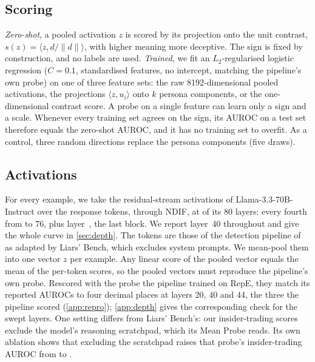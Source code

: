 \subsection{Scoring}

\emph{Zero-shot}, a pooled activation $z$ is scored by its projection onto the unit contrast,
$s(z)=\langle z, d/\lVert d\rVert\rangle$, with higher meaning more deceptive. The sign is fixed by
construction, and no labels are used. \emph{Trained}, we fit an $L_2$-regularised logistic
regression ($C=0.1$, standardised features, no intercept, matching the pipeline's own probe) on
one of three feature sets: the raw 8192-dimensional pooled activations, the projections
$\langle z,u_i\rangle$ onto $k$ persona components, or the one-dimensional contrast score. A probe
on a single feature can learn only a sign and a scale. Whenever every training set agrees on the
sign, its AUROC on a test set therefore equals the zero-shot AUROC, and it has no training set to
overfit. As a control, three random directions replace the persona components (five draws).

\subsection{Activations}

For every example, we take the residual-stream activations of Llama-3.3-70B-Instruct over the
response tokens, through NDIF, at  of its 80 layers: every fourth from 
to 76, plus layer~, the last block. We report layer~40 throughout and give the whole
curve in \cref{sec:depth}. The tokens are those of the
detection pipeline of \citet{goldowskydill2025detecting} as adapted by Liars' Bench, which
excludes system prompts. We mean-pool them into one vector $z$ per example. Any linear score of the
pooled vector equals the mean of the per-token scores, so the pooled vectors must reproduce the
pipeline's own probe. Rescored with the probe the pipeline trained on RepE, they match its reported
AUROCs to four decimal places at layers 20, 40 and 44, the three the pipeline scored
(\cref{app:repro}); \cref{app:depth} gives the corresponding check for the swept layers. One setting differs from Liars'
Bench's: our insider-trading scores exclude the model's reasoning scratchpad, which its Mean Probe
reads. Its own ablation shows that excluding the scratchpad raises that probe's insider-trading
AUROC from  to  \citep[Table~17]{kretschmar2025liars}.
